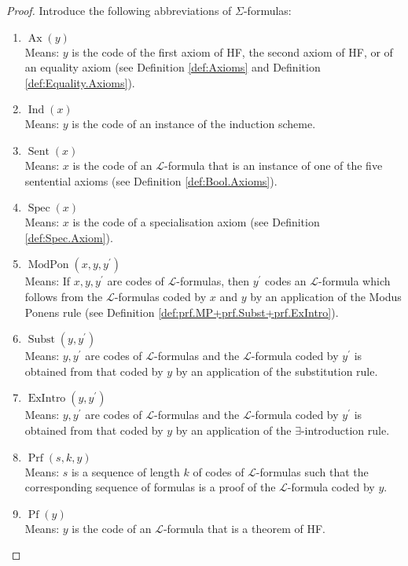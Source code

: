\begin{proof}
    Introduce the following abbreviations of $\Sigma$-formulas:
    \begin{enumerate}
        \item $\operatorname{Ax}(y)$\\
        Means: $y$ is the code of the first axiom of HF, the second axiom of HF, or
        of an equality axiom 
        (see Definition \ref{def:Axioms} and Definition \ref{def:Equality.Axioms}).
        \item $\operatorname{Ind}(x)$\\
        Means: $y$ is the code of an instance of the induction scheme.
        \item $\operatorname{Sent}(x)$\\
        Means: $x$ is the code of an $\mathcal{L}$-formula that is an instance 
        of one of the five sentential axioms (see Definition \ref{def:Bool.Axioms}).
        \item $\operatorname{Spec}(x)$\\
        Means: $x$ is the code of a specialisation axiom (see Definition \ref{def:Spec.Axiom}).
        \item $\operatorname{ModPon}(x,y,y^\prime)$\\
        Means: If $x,y,y^\prime$ are codes of $\mathcal{L}$-formulas, 
        then $y^\prime$ codes an $\mathcal{L}$-formula which follows from the $\mathcal{L}$-formulas
        coded by $x$ and $y$ by an application of the Modus Ponens rule 
        (see Definition \ref{def:prf.MP+prf.Subst+prf.ExIntro}).
        \item $\operatorname{Subst}(y,y^\prime)$\\
        Means: $y,y^\prime$ are codes of $\mathcal{L}$-formulas and
        the $\mathcal{L}$-formula coded by $y^\prime$ is obtained from that coded by $y$ by
        an application of the substitution rule.
        \item $\operatorname{ExIntro}(y, y^\prime)$\\
        Means: $y,y^\prime$ are codes of $\mathcal{L}$-formulas and
        the $\mathcal{L}$-formula coded by $y^\prime$ is obtained from that coded by $y$ by
        an application of the $\exists$-introduction rule.
        \item $\operatorname{Prf}(s, k, y)$\\
        Means: $s$ is a sequence of length $k$ of codes of $\mathcal{L}$-formulas 
        such that the corresponding sequence of formulas is a proof of the 
        $\mathcal{L}$-formula coded by $y$.
        \item $\operatorname{Pf}(y)$\\
        Means: $y$ is the code of an $\mathcal{L}$-formula that is a theorem of HF.
    \end{enumerate}
\end{proof}

